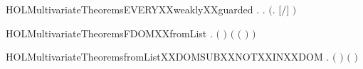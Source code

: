 \newcommand{\HOLMultivariateTheoremsdisjointXXimpXXweaklyXXguarded}{\UseVerbatim{HOLMultivariateTheoremsdisjointXXimpXXweaklyXXguarded}}
\begin{SaveVerbatim}{HOLMultivariateTheoremsEVERYXXweaklyXXguarded}
\HOLTokenTurnstile{} \HOLSymConst{\HOLTokenForall{}} .
          \HOLSymConst{\HOLTokenImp{}}
       \HOLSymConst{\HOLTokenForall{}} .    \HOLSymConst{\HOLTokenConj{}}    \HOLSymConst{\HOLTokenImp{}}  \ensuremath{(}\HOLTokenLambda{}. \ensuremath{[}\ensuremath{/}\ensuremath{]} \ensuremath{)}
\end{SaveVerbatim}
\newcommand{\HOLMultivariateTheoremsEVERYXXweaklyXXguarded}{\UseVerbatim{HOLMultivariateTheoremsEVERYXXweaklyXXguarded}}
\begin{SaveVerbatim}{HOLMultivariateTheoremsFDOMXXfromList}
\HOLTokenTurnstile{} \HOLSymConst{\HOLTokenForall{}} .
       \ensuremath{(}  \HOLSymConst{\ensuremath{=}}  \ensuremath{)} \HOLSymConst{\HOLTokenImp{}}
       \ensuremath{(} \ensuremath{(}  \ensuremath{)} \HOLSymConst{\ensuremath{=}}  \ensuremath{)}
\end{SaveVerbatim}
\newcommand{\HOLMultivariateTheoremsFDOMXXfromList}{\UseVerbatim{HOLMultivariateTheoremsFDOMXXfromList}}
\begin{SaveVerbatim}{HOLMultivariateTheoremsfromListXXDOMSUBXXNOTXXINXXDOM}
\HOLTokenTurnstile{} \HOLSymConst{\HOLTokenForall{}}  .
       \HOLSymConst{\HOLTokenNeg{}}   \HOLSymConst{\HOLTokenConj{}} \ensuremath{(}  \HOLSymConst{\ensuremath{=}}  \ensuremath{)} \HOLSymConst{\HOLTokenImp{}}
       \ensuremath{(}   \HOLSymConst{\ensuremath{\setminus}}  \HOLSymConst{\ensuremath{=}}   \ensuremath{)}
\end{SaveVerbatim}
\newcommand{\HOLMultivariateTheoremsfromListXXDOMSUBXXNOTXXINXXDOM}{\UseVerbatim{HOLMultivariateTheoremsfromListXXDOMSUBXXNOTXXINXXDOM}}
